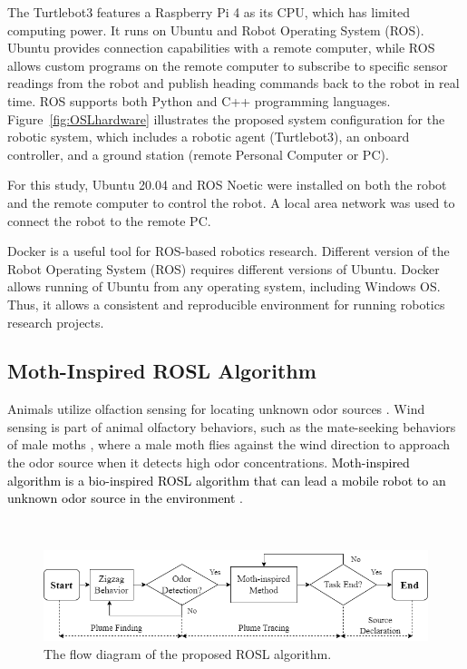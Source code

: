 The Turtlebot3 features a Raspberry Pi 4 as its CPU, which has limited computing power. It runs on Ubuntu and Robot Operating System (ROS). Ubuntu provides connection capabilities with a remote computer, while ROS allows custom programs on the remote computer to subscribe to specific sensor readings from the robot and publish heading commands back to the robot in real time. ROS supports both Python and C++ programming languages. Figure~\ref{fig:OSLhardware} illustrates the proposed system configuration for the robotic system, which includes a robotic agent (Turtlebot3), an onboard controller, and a ground station (remote Personal Computer or PC). 

For this study, Ubuntu 20.04 and ROS Noetic were installed on both the robot and the remote computer to control the robot. A local area network was used to connect the robot to the remote PC.

Docker is a useful tool for ROS-based robotics research. Different version of the Robot Operating System (ROS) requires different versions of Ubuntu. Docker allows running of Ubuntu from any operating system, including Windows OS. Thus, it allows a consistent and reproducible environment for running robotics research projects.


\subsection{Moth-Inspired ROSL Algorithm}\label{subsec:moth-inspired}
Animals utilize olfaction sensing for locating unknown odor sources \cite{carde2008navigational, nielsen2015olfaction}. Wind sensing is part of animal olfactory behaviors, such as the mate-seeking behaviors of male moths \cite{murlis1992odor}, where a male moth flies against the wind direction to approach the odor source when it detects high odor concentrations. \textcolor{black}{Moth-inspired algorithm is a bio-inspired ROSL algorithm that can lead a mobile robot to an unknown odor source in the environment \cite{shigaki2017time}}.

\begin{figure}[h!]

\ \\
\vspace*{-.18in}

\begin{center}
\includegraphics[width=0.7\columnwidth]{Main/Figure/olfaction_flow_diagram.png}\hspace*{0.04in}
\end{center}
\vspace{-.1in}

\caption
{The flow diagram of the proposed ROSL algorithm.}
\label{fig:mothinspiredFlow_diagram}
\end{figure}


